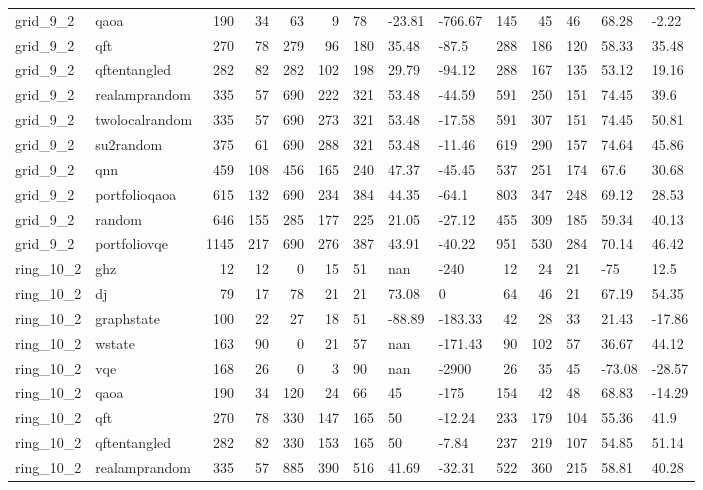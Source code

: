 \begin{longtable}{llrrrrlllrrlll}
grid\_9\_2 & qaoa & 190 & 34 & 63 & 9 & 78 & -23.81 & -766.67 & 145 & 45 & 46 & 68.28 & -2.22 \\
grid\_9\_2 & qft & 270 & 78 & 279 & 96 & 180 & 35.48 & -87.5 & 288 & 186 & 120 & 58.33 & 35.48 \\
grid\_9\_2 & qftentangled & 282 & 82 & 282 & 102 & 198 & 29.79 & -94.12 & 288 & 167 & 135 & 53.12 & 19.16 \\
grid\_9\_2 & realamprandom & 335 & 57 & 690 & 222 & 321 & 53.48 & -44.59 & 591 & 250 & 151 & 74.45 & 39.6 \\
grid\_9\_2 & twolocalrandom & 335 & 57 & 690 & 273 & 321 & 53.48 & -17.58 & 591 & 307 & 151 & 74.45 & 50.81 \\
grid\_9\_2 & su2random & 375 & 61 & 690 & 288 & 321 & 53.48 & -11.46 & 619 & 290 & 157 & 74.64 & 45.86 \\
grid\_9\_2 & qnn & 459 & 108 & 456 & 165 & 240 & 47.37 & -45.45 & 537 & 251 & 174 & 67.6 & 30.68 \\
grid\_9\_2 & portfolioqaoa & 615 & 132 & 690 & 234 & 384 & 44.35 & -64.1 & 803 & 347 & 248 & 69.12 & 28.53 \\
grid\_9\_2 & random & 646 & 155 & 285 & 177 & 225 & 21.05 & -27.12 & 455 & 309 & 185 & 59.34 & 40.13 \\
grid\_9\_2 & portfoliovqe & 1145 & 217 & 690 & 276 & 387 & 43.91 & -40.22 & 951 & 530 & 284 & 70.14 & 46.42 \\
ring\_10\_2 & ghz & 12 & 12 & 0 & 15 & 51 & nan & -240 & 12 & 24 & 21 & -75 & 12.5 \\
ring\_10\_2 & dj & 79 & 17 & 78 & 21 & 21 & 73.08 & 0 & 64 & 46 & 21 & 67.19 & 54.35 \\
ring\_10\_2 & graphstate & 100 & 22 & 27 & 18 & 51 & -88.89 & -183.33 & 42 & 28 & 33 & 21.43 & -17.86 \\
ring\_10\_2 & wstate & 163 & 90 & 0 & 21 & 57 & nan & -171.43 & 90 & 102 & 57 & 36.67 & 44.12 \\
ring\_10\_2 & vqe & 168 & 26 & 0 & 3 & 90 & nan & -2900 & 26 & 35 & 45 & -73.08 & -28.57 \\
ring\_10\_2 & qaoa & 190 & 34 & 120 & 24 & 66 & 45 & -175 & 154 & 42 & 48 & 68.83 & -14.29 \\
ring\_10\_2 & qft & 270 & 78 & 330 & 147 & 165 & 50 & -12.24 & 233 & 179 & 104 & 55.36 & 41.9 \\
ring\_10\_2 & qftentangled & 282 & 82 & 330 & 153 & 165 & 50 & -7.84 & 237 & 219 & 107 & 54.85 & 51.14 \\
ring\_10\_2 & realamprandom & 335 & 57 & 885 & 390 & 516 & 41.69 & -32.31 & 522 & 360 & 215 & 58.81 & 40.28 \\

\end{longtable}
